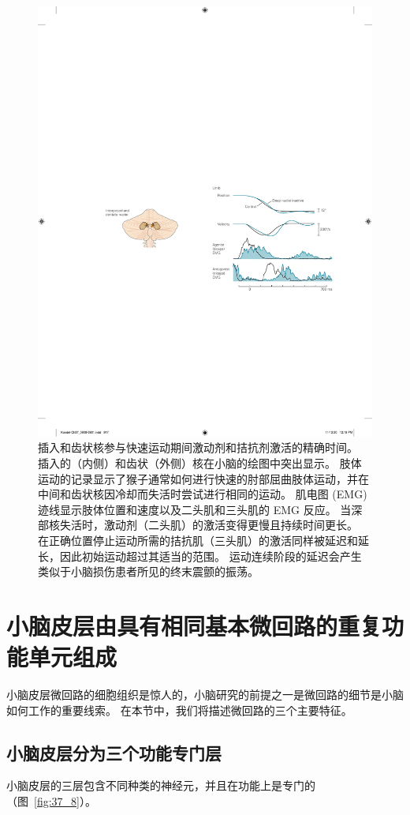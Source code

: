 \begin{figure}[htbp]
	\centering
	\includegraphics[width=0.5\linewidth]{chap37/fig_37_7}
	\caption{插入和齿状核参与快速运动期间激动剂和拮抗剂激活的精确时间。 插入的（内侧）和齿状（外侧）核在小脑的绘图中突出显示。 肢体运动的记录显示了猴子通常如何进行快速的肘部屈曲肢体运动，并在中间和齿状核因冷却而失活时尝试进行相同的运动。 肌电图 (EMG) 迹线显示肢体位置和速度以及二头肌和三头肌的 EMG 反应。 当深部核失活时，激动剂（二头肌）的激活变得更慢且持续时间更长。 在正确位置停止运动所需的拮抗肌（三头肌）的激活同样被延迟和延长，因此初始运动超过其适当的范围。 运动连续阶段的延迟会产生类似于小脑损伤患者所见的终末震颤的振荡。}
	\label{fig:37_7}
\end{figure}



\section{小脑皮层由具有相同基本微回路的重复功能单元组成}

小脑皮层微回路的细胞组织是惊人的，小脑研究的前提之一是微回路的细节是小脑如何工作的重要线索。
在本节中，我们将描述微回路的三个主要特征。



\subsection{小脑皮层分为三个功能专门层}

小脑皮层的三层包含不同种类的神经元，并且在功能上是专门的（图~\ref{fig:37_8}）。


